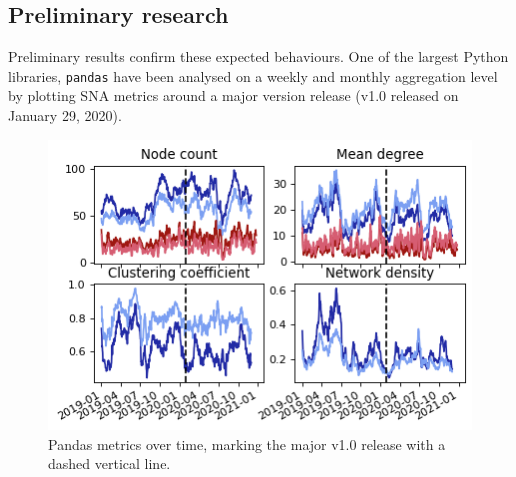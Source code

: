 
\subsection{Preliminary research}
Preliminary results confirm these expected behaviours. One of the largest Python libraries, \texttt{pandas} have been analysed on a weekly and monthly aggregation level by plotting  SNA metrics around a major version release (v1.0 released on January 29, 2020). \\


\begin{figure}[h!]
    \centering
    \includegraphics{figures/pandas.png}
    \caption{Pandas metrics over time, marking the major v1.0 release with a dashed vertical line.}
    \label{fig:pandas}
\end{figure}

